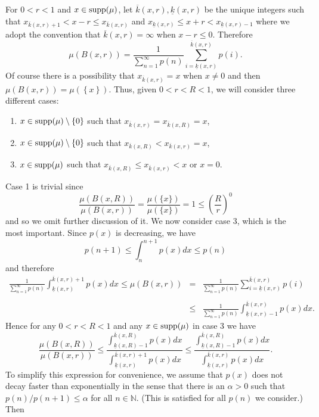 For  $0<r<1$ and $x\in  \textup{supp}(\mu)$, let $\overline{k}(x,r), \underline{k}(x,r)$   be the unique  integers such that $x_{\overline{k}(x,r)+1}<x-r\le x_{\overline{k}(x,r)}$ and  $x_{\underline{k}(x,r)}\le x+r <x_{\underline{k}(x,r)-1}$ where we adopt the convention that $\overline{k}(x,r) = \infty$ when $x-r \le 0$.  Therefore 
$$
\mu(B(x,r))=\frac{1}{\sum_{n=1}^\infty p(n)} \sum_{i=\underline{k}(x,r)}^{\overline{k}(x,r)} p(i).
$$
Of course there is a possibility that $x_{\overline{k}(x,r)}=x$ when $x\neq 0$ and then $\mu(B(x,r))=\mu(\left\{x\right\})$. Thus, given $0<r<R<1$, we will consider three different cases: 
\begin{enumerate}
	\item $x\in \textup{supp}(\mu) \setminus \left\{ 0\right\}$  such that  $x_{\overline{k}(x,r)}=x_{\overline{k}(x,R)}=x$,
	\item $x\in \textup{supp}(\mu) \setminus \left\{ 0\right\}$ such that  $x_{\overline{k}(x,R)}<x_{\overline{k}(x,r)}=x$,
	\item $x\in \textup{supp}(\mu)$ such that  $x_{\overline{k}(x,R)}\le x_{\overline{k}(x,r)}<x$ or $x=0$.
\end{enumerate}
Case 1 is trivial since
\[
\frac{\mu(B(x,R))}{\mu(B(x,r))}=\frac{\mu(\{x\})}{\mu(\{x\})}=1 \leq \left(\frac{R}{r}\right)^0
\]
and so we omit further discussion of it.   We now consider case 3, which is the most important.  Since $p(x)$ is decreasing, we have
$$p(n+1)\le \int_{n}^{n+1}p(x)dx \le p(n)$$
and therefore
\begin{eqnarray*}
	\frac{1}{\sum_{n=1}^\infty p(n)} \int_{\underline{k}(x,r)}^{\overline{k}(x,r)+1} p(x)dx \le  \mu(B(x,r)) &=& \frac{1}{\sum_{n=1}^\infty p(n)}\sum_{i=\underline{k}(x,r)}^{\overline{k}(x,r)} p(i) \\ \\
	&\le& \frac{1}{\sum_{n=1}^\infty p(n)} \int_{\underline{k}(x,r)-1}^{\overline{k}(x,r)} p(x)dx .
\end{eqnarray*}
Hence for any $0<r<R<1$ and any $x\in  \textup{supp}(\mu)$ in case 3 we have
\[
\frac{\mu(B(x,R))}{\mu(B(x,r))} \le \frac{\int_{\underline{k}(x,R)-1}^{\overline{k}(x,R)} p(x)dx}{\int_{\underline{k}(x,r)}^{\overline{k}(x,r)+1} p(x)dx} \le \frac{\int_{\underline{k}(x,R)-1}^{\overline{k}(x,R)} p(x)dx}{\int_{\underline{k}(x,r)}^{\overline{k}(x,r)} p(x)dx}.
\]
To simplify this expression for convenience, we assume that $p(x)$ does not decay faster than exponentially in the sense that there is an $\alpha>0$ such that $p(n)/p(n+1) \le \alpha$ for all $n\in \mathbb{N}$. (This is satisfied for all $p(n)$ we consider.) Then
